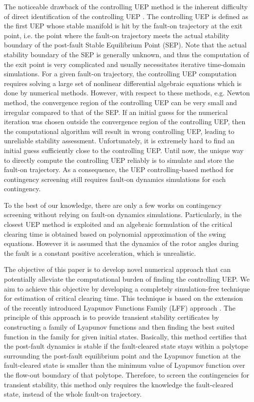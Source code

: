 \documentclass[final]{IEEEtran}
\begin{document}
The noticeable drawback of the controlling UEP method is the
inherent difficulty of direct identification of the controlling UEP
\cite{Chiang:2013}. The controlling UEP is defined as the first
UEP whose stable manifold is hit by the fault-on trajectory at the
exit point, i.e. the point where the fault-on trajectory meets the
actual stability boundary of the post-fault Stable Equilibrium Point (SEP). 
Note that the actual stability boundary of the SEP is generally unknown, and
thus the computation of the exit point is very complicated and
usually necessitates iterative time-domain simulations. For a given 
fault-on trajectory, the controlling UEP computation requires solving a large set
of nonlinear differential algebraic equations which is done by
numerical methods. However, with respect to these methods, e.g. Newton method,
the convergence region of the controlling UEP can be very small and irregular 
compared to that of the SEP. If an initial guess for the numerical
iteration was chosen outside the convergence region of the controlling UEP,
then the computational algorithm will result in wrong controlling
UEP, leading to unreliable stability assessment. Unfortunately, it
is extremely hard to find an initial guess sufficiently close to
the controlling UEP. Until now, the unique way to directly compute
the controlling UEP reliably is to simulate and store the fault-on
trajectory. As a consequence, the UEP controlling-based method for
contingency screening still requires fault-on dynamics simulations
for each contingency.

To the best of our knowledge, there are only a few works on
contingency screening without relying on fault-on dynamics
simulations. Particularly, in \cite{roberts2015algebraic} the
closest UEP method is exploited and an algebraic formulation of
the critical clearing time is obtained based on polynomial
approximation of the swing equations. However it is assumed that the
dynamics of the rotor angles during  the  fault  is  a  constant
positive  acceleration, which is unrealistic.




The objective of this paper is to develop novel numerical approach that can potentially alleviate the computational burden of finding the controlling UEP. We aim to achieve this objective by developing a completely simulation-free technique for estimation of critical clearing time. This technique is based on the extension of the recently
introduced  Lyapunov Functions Family (LFF) approach \cite{Vu:2014, Vu:2014acc}. The principle of this approach is to
provide transient stability certificates by constructing a
family of Lyapunov functions and then finding the best suited
function in the family for given initial states. Basically, this
method certifies that the post-fault dynamics is stable if the
fault-cleared state stays within a polytope surrounding the
post-fault equilibrium point and the Lyapunov function at the
fault-cleared state is smaller than the minimum value of Lyapunov
function over the flow-out boundary of that polytope. Therefore,
to screen the contingencies for transient stability, this method
only requires the knowledge the fault-cleared state, instead of the
whole fault-on trajectory.
\end{document}
